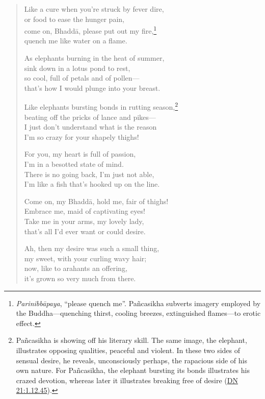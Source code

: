 \documentclass[12pt,openany]{book}%
\begin{document}
\begin{verse}
Like a cure when you’re struck by fever dire, \\
or food to ease the hunger pain, \\
come on, \textsanskrit{Bhaddā}, please put out my fire,\footnote{\textit{\textsanskrit{Parinibbāpaya}}, “please quench me”. \textsanskrit{Pañcasikha} subverts imagery employed by the Buddha—quenching thirst, cooling breezes, extinguished flames—to erotic effect. } \\
quench me like water on a flame. 

As elephants burning in the heat of summer, \\
sink down in a lotus pond to rest, \\
so cool, full of petals and of pollen—\\
that’s how I would plunge into your breast. 

Like elephants bursting bonds in rutting season,\footnote{\textsanskrit{Pañcasikha} is showing off his literary skill. The same image, the elephant, illustrates opposing qualities, peaceful and violent. In these two sides of sensual desire, he reveals, unconsciously perhaps, the rapacious side of his own nature. For \textsanskrit{Pañcasikha}, the elephant bursting its bonds illustrates his crazed devotion, whereas later it illustrates breaking free of desire (\href{https://suttacentral.net/dn21/en/sujato\#1.12.45}{DN 21:1.12.45}). } \\
beating off the pricks of lance and pikes—\\
I just don’t understand what is the reason \\
I’m so crazy for your shapely thighs! 

For you, my heart is full of passion, \\
I’m in a besotted state of mind. \\
There is no going back, I’m just not able, \\
I’m like a fish that’s hooked up on the line. 

Come on, my \textsanskrit{Bhaddā}, hold me, fair of thighs! \\
Embrace me, maid of captivating eyes! \\
Take me in your arms, my lovely lady, \\
that’s all I’d ever want or could desire. 

Ah, then my desire was such a small thing, \\
my sweet, with your curling wavy hair; \\
now, like to arahants an offering, \\
it’s grown so very much from there. 


\end{verse}
\end{document}
